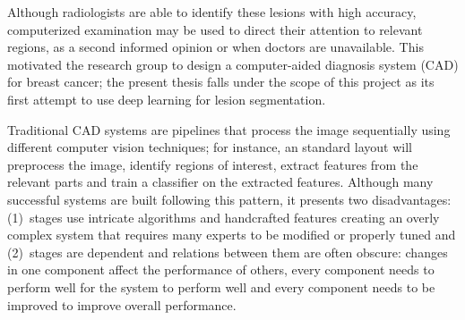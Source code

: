 Although radiologists are able to identify these lesions with high accuracy, computerized examination may be used to direct their attention to relevant regions, as a second informed opinion or when doctors are unavailable. 
This motivated the research group to design a computer-aided diagnosis system (CAD) for breast cancer; the present thesis falls under the scope of this project as its first attempt to use deep learning for lesion segmentation.

Traditional CAD systems are pipelines that process the image sequentially using different computer vision techniques; for instance, an standard layout will preprocess the image, identify regions of interest, extract features from the relevant parts and train a classifier on the extracted features.
Although many successful systems are built following this pattern, it presents two disadvantages: (1)~stages use intricate algorithms and handcrafted features creating an overly complex system that requires many experts to be modified or properly tuned and (2)~stages are dependent and relations between them are often obscure: changes in one component affect the performance of others, every component needs to perform well for the system to perform well and every component needs to be improved to improve overall performance.

